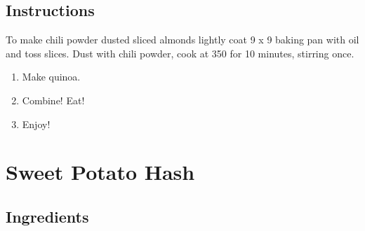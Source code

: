 \documentclass[letterpaper,10pt,english]{sphinxmanual}
\begin{document}
\section{Instructions}
\label{\detokenize{SA_Quinoa_Salad:instructions}}
To make chili powder dusted sliced almonds lightly coat 9 x 9 baking pan with oil and toss slices.  Dust with chili powder, cook at 350 for 10 minutes, stirring once.
\begin{enumerate}
\item {} 
Make quinoa.

\item {} 
Combine! Eat!

\item {} 
Enjoy!

\end{enumerate}


\chapter{Sweet Potato Hash}
\label{\detokenize{SPH:sweet-potato-hash}}\label{\detokenize{SPH::doc}}

\section{Ingredients}
\label{\detokenize{SPH:ingredients}}
%
\begin{sphinxVerbatim}[commandchars=\\\{\}]
  

   

 

  

    

      

  

  

 
\end{sphinxVerbatim}
\end{document}
